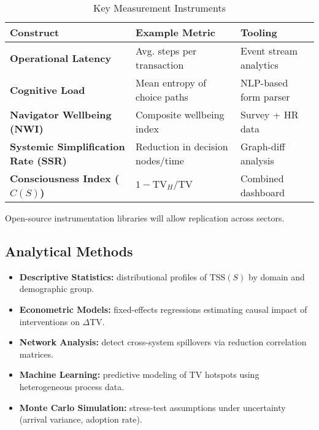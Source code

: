 \begin{table}[h]
\centering
\caption{Key Measurement Instruments}
\label{tab:instruments}
\begin{tabular}{p{4cm}p{4cm}p{4cm}}
\toprule
\textbf{Construct} & \textbf{Example Metric} & \textbf{Tooling} \\
\midrule
\textbf{Operational Latency} & Avg. steps per transaction & Event stream analytics \\
\addlinespace
\textbf{Cognitive Load} & Mean entropy of choice paths & NLP-based form parser \\
\addlinespace
\textbf{Navigator Wellbeing (NWI)} & Composite wellbeing index & Survey + HR data \\
\addlinespace
\textbf{Systemic Simplification Rate (SSR)} & Reduction in decision nodes/time & Graph-diff analysis \\
\addlinespace
\textbf{Consciousness Index ($C(S)$)} & $1 - \text{TV}_H/\text{TV}$ & Combined dashboard \\
\bottomrule
\end{tabular}
\end{table}

Open-source instrumentation libraries will allow replication across sectors.

\subsection{Analytical Methods}
\label{sec:analytical-methods}

\begin{itemize}
    \item \textbf{Descriptive Statistics:} distributional profiles of $\text{TSS}(S)$ by domain and demographic group.
    \item \textbf{Econometric Models:} fixed-effects regressions estimating causal impact of interventions on $\Delta$TV.
    \item \textbf{Network Analysis:} detect cross-system spillovers via reduction correlation matrices.
    \item \textbf{Machine Learning:} predictive modeling of TV hotspots using heterogeneous process data.
    \item \textbf{Monte Carlo Simulation:} stress-test assumptions under uncertainty (arrival variance, adoption rate).
\end{itemize}


